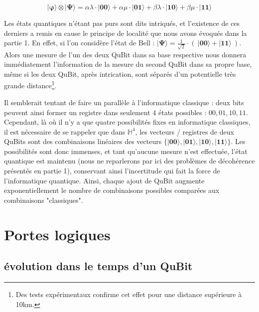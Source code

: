 \documentclass[a4paper,12pt]{report}
\newcommand{\quSt}[1]{\bm{|#1\rangle}}
\begin{document}
\begin{equation}
	\quSt{\varphi} \otimes \quSt{\Psi} = \alpha \lambda \cdot \quSt{00} + \alpha \mu \cdot \quSt{01} + \beta \lambda \cdot \quSt{10} + \beta \mu \cdot \quSt{11}
\end{equation}

\vspace{1\baselineskip}

\par{
	Les états quantiques n'étant pas purs sont dits intriqués, et l'existence de ces derniers a remis en cause le principe de localité que nous avons évoqués dans la partie 1. En effet, si l'on considère l'état de Bell : $\quSt{\Psi} = \frac{1}{\sqrt{2}} \cdot (~ \quSt{00} + \quSt{11}  ~)$. Alors une mesure de l'un des deux QuBit dans sa base respective nous donnera immédiatement l'information de la mesure du second QuBit dans sa propre base, même si les deux QuBit, après intrication, sont séparés d'un potentielle très grande distance\footnote{Des tests expérimentaux confirme cet effet pour une distance supérieure à 10km.}.
}

\vspace{1\baselineskip}

\par{
	Il semblerait tentant de faire un parallèle à l'informatique classique : deux bits peuvent ainsi former un registre dans seulement 4 états possibles : ${ 00, 01, 10, 11 }$. Cependant, là où il n'y a que quatre possibilités fixes en informatique classiques, il est nécessaire de se rappeler que dans $\mathbb{H}^4$, les vecteurs / registres de deux QuBits sont des combinaisons linéaires des vecteurs $ \{ \quSt{00}, \quSt{01}, \quSt{10}, \quSt{11} \} $. Les possibilités sont donc immenses, et tant qu'aucune mesure n'est effectuée, l'état quantique est maintenu (nous ne reparlerons par ici des problèmes de décohérence présentés en partie 1), conservant ainsi l'incertitude qui fait la force de l'informatique quantique. Ainsi, chaque ajout de QuBit augmente exponentiellement le nombre de combinaisons possibles comparées aux combinaisons "classiques".
}

	\section{Portes logiques}

		\subsection{évolution dans le temps d'un QuBit}
\end{document}
